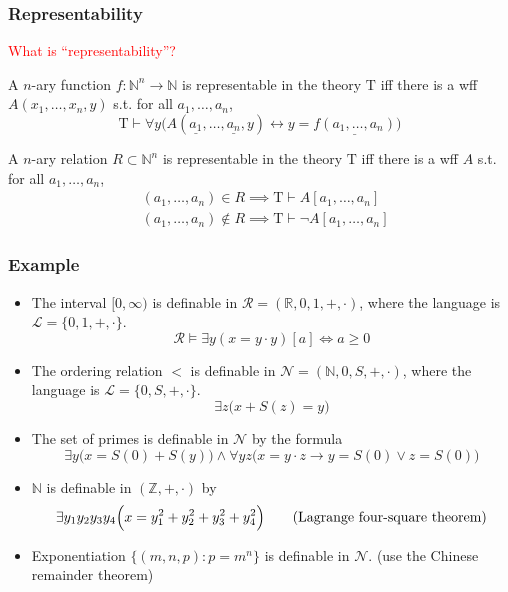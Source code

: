 \documentclass[UTF8,aspectratio=43,11pt,colorlinks,compress,openany]{beamer}%
\begin{document}
\begin{frame}\frametitle{Representability}
	\begin{block}{}
		\begin{center}
			\textcolor{red}{What is ``representability''?}
		\end{center}
	\end{block}
	\begin{definition}
		A $n$-ary function $f:\mathbb{N}^n\to\mathbb{N}$ is representable in the theory $\mathrm{T}$ iff there is a wff $A(x_1,\dots,x_n,y)$ s.t. for all $a_1,\dots,a_n$,
	\setlength\belowdisplayskip{0pt}
		\[\mathrm{T}\vdash\forall y\Big(A(\underline{a_1},\dots,\underline{a_n},y)\leftrightarrow y=\underline{f(a_1,\dots,a_n)}\Big)\]
	\end{definition}
	\begin{definition}
		A $n$-ary relation $R\subset\mathbb{N}^n$ is representable in the theory $\mathrm{T}$ iff there is a wff $A$ s.t. for all $a_1,\dots,a_n$,
	\setlength\abovedisplayskip{0pt}
	\setlength\belowdisplayskip{0pt}
		\begin{align*}
		&(a_1,\dots,a_n)\in R\implies \mathrm{T}\vdash A[a_1,\dots,a_n]\\
		&(a_1,\dots,a_n)\notin R\implies \mathrm{T}\vdash\neg A[a_1,\dots,a_n]
		\end{align*}
	\end{definition}
	\centering{}
\end{frame}

\begin{frame}\frametitle{Example}
	\begin{itemize}
		\item The interval $[0,\infty)$ is definable in $\mathcal{R}=(\mathbb{R},0,1,+,\cdot)$, where the language is $\mathscr{L}=\{0,1,+,\cdot\}$.
		\[\mathcal{R}\vDash\exists y(x=y\cdot y)[a]\iff a\geq 0\]
		\item The ordering relation $<$ is definable in $\mathcal{N}=(\mathbb{N},0,S,+,\cdot)$, where the language is $\mathscr{L}=\{0,S,+,\cdot\}$.
		\[\exists z\bigl(x+S(z)=y\bigr)\]
		\item The set of primes is definable in $\mathcal{N}$ by the formula
		\[\exists y\bigl(x=S(0)+S(y)\bigr)\wedge\forall yz\bigl(x=y\cdot z\to y=S(0)\vee z=S(0)\bigr)\]
		\item $\mathbb{N}$ is definable in $(\mathbb{Z},+,\cdot)$ by
		\[\exists y_1y_2y_3y_4\Big(x=y_1^2+y_2^2+y_3^2+y_4^2\Big)\tag{\text{Lagrange four-square theorem}}\]
		\item Exponentiation $\big\{(m,n,p): p=m^n\big\}$ is definable in $\mathcal{N}$. (use the Chinese remainder theorem)
	\end{itemize}
\end{frame}
\end{document}

